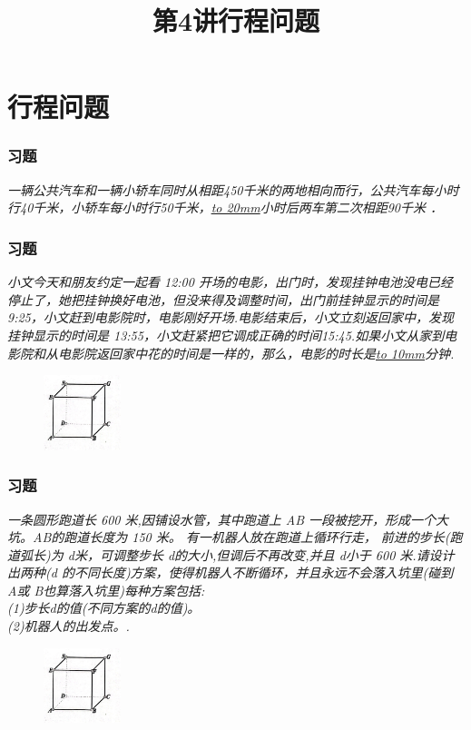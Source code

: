 \section{行程问题}

\title[第4讲\quad 行程问题]{第4讲\quad 行程问题} 
\author{}
\date{}

\begin{frame}
    \titlepage
\end{frame}

\setcounter{framecounter}{0}

\begin{frame}
    \frametitle{习题\theframecounter}
    \textit{一辆公共汽车和一辆小轿车同时从相距450千米的两地相向而行，公共汽车每小时行40千米，小轿车每小时行50千米，\underline{\hbox to 20mm{}}小时后两车第二次相距90千米 ．} 
\end{frame}

\begin{frame}
    \frametitle{习题\theframecounter}
    \textit{小文今天和朋友约定一起看 12:00 开场的电影，出门时，发现挂钟电池没电已经停止了，她把挂钟换好电池，但没来得及调整时间，出门前挂钟显示的时间是 9:25，小文赶到电影院时，电影刚好开场.电影结束后，小文立刻返回家中，发现挂钟显示的时间是 13:55，小文赶紧把它调成正确的时间15:45.如果小文从家到电影院和从电影院返回家中花的时间是一样的，那么，电影的时长是\underline{\hbox to 10mm{}}分钟.}
    \begin{figure}[H] 
        \centering
        \includegraphics[width=0.2\textwidth]{./pics/Chapter_4/2.png}
    \end{figure}
\end{frame}


\begin{frame}
    \frametitle{习题\theframecounter}
    \textit{一条圆形跑道长 600 米,因铺设水管，其中跑道上 AB 一段被挖开，形成一个大坑。AB的跑道长度为 150 米。 有一机器人放在跑道上循环行走， 前进的步长(跑道弧长)为 d米，可调整步长 d的大小,但调后不再改变,并且 d小于 600 米.请设计出两种(d 的不同长度)方案，使得机器人不断循环，并且永远不会落入坑里(碰到 A或 B也算落入坑里)每种方案包括:\\
    (1)步长d的值(不同方案的d的值)。\\
    (2)机器人的出发点。.}
    \begin{figure}[H] 
        \centering
        \includegraphics[width=0.2\textwidth]{./pics/Chapter_4/2.png}
    \end{figure}
\end{frame}


